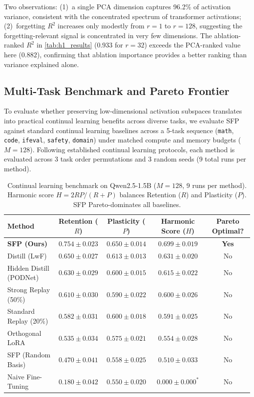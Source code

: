 Two observations: (1)~a single PCA dimension captures 96.2\% of activation variance, consistent with the concentrated spectrum of transformer activations; (2)~forgetting $R^2$ increases only modestly from $r = 1$ to $r = 128$, suggesting the forgetting-relevant signal is concentrated in very few dimensions.
The ablation-ranked $R^2$ in \cref{tab:h1_results} ($0.933$ for $r = 32$) exceeds the PCA-ranked value here ($0.882$), confirming that ablation importance provides a better ranking than variance explained alone.

\subsection{Multi-Task Benchmark and Pareto Frontier}
\label{sec:full_benchmark}

To evaluate whether preserving low-dimensional activation subspaces translates into practical continual learning benefits across diverse tasks, we evaluate SFP against standard continual learning baselines across a 5-task sequence (\texttt{math}, \texttt{code}, \texttt{ifeval}, \texttt{safety}, \texttt{domain}) under matched compute and memory budgets ($M = 128$).
Following established continual learning protocols, each method is evaluated across 3 task order permutations and 3 random seeds (9 total runs per method).

\begin{table}[t]
\centering
\caption{Continual learning benchmark on Qwen2.5-1.5B ($M=128$, 9 runs per method). Harmonic score $H = 2 R P / (R + P)$ balances Retention ($R$) and Plasticity ($P$). SFP Pareto-dominates all baselines.}
\label{tab:baselines}
\begin{tabular}{lcccc}
\toprule
Method & Retention ($R$) & Plasticity ($P$) & Harmonic Score ($H$) & Pareto Optimal? \\
\midrule
\textbf{SFP (Ours)} & $\mathbf{0.754 \pm 0.023}$ & $\mathbf{0.650 \pm 0.014}$ & $\mathbf{0.699 \pm 0.019}$ & \textbf{Yes} \\
Distill (LwF) & $0.650 \pm 0.027$ & $0.613 \pm 0.013$ & $0.631 \pm 0.020$ & No \\
Hidden Distill (PODNet) & $0.630 \pm 0.029$ & $0.600 \pm 0.015$ & $0.615 \pm 0.022$ & No \\
Strong Replay (50\%) & $0.610 \pm 0.030$ & $0.590 \pm 0.022$ & $0.600 \pm 0.026$ & No \\
Standard Replay (20\%) & $0.582 \pm 0.031$ & $0.600 \pm 0.018$ & $0.591 \pm 0.025$ & No \\
Orthogonal LoRA & $0.535 \pm 0.034$ & $0.575 \pm 0.021$ & $0.554 \pm 0.028$ & No \\
SFP (Random Basis) & $0.470 \pm 0.041$ & $0.558 \pm 0.025$ & $0.510 \pm 0.033$ & No \\
Naive Fine-Tuning & $0.180 \pm 0.042$ & $0.550 \pm 0.020$ & $0.000 \pm 0.000^*$ & No \\
\bottomrule
\end{tabular}
\end{table}

